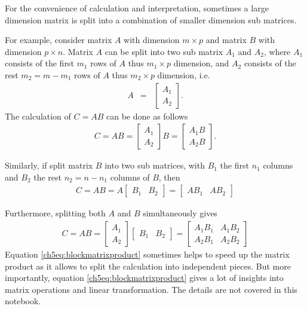 For the convenience of calculation and interpretation, sometimes a large dimension matrix is split into a combination of smaller dimension sub matrices.

For example, consider matrix $A$ with dimension $m \times p$ and matrix $B$ with dimension $p\times n$. Matrix $A$ can be split into two sub matrix $A_1$ and $A_2$, where $A_1$ consists of the first $m_1$ rows of $A$ thus $m_1 \times p$ dimension, and $A_2$ consists of the rest $m_2 = m - m_1$ rows of $A$ thus $m_2\times p$ dimension, i.e.
\begin{eqnarray}
    A &=& \left[\begin{array}{c}
         A_1  \\
         A_2 
    \end{array}\right]. \nonumber
\end{eqnarray}
The calculation of $C=AB$ can be done as follows
\begin{eqnarray}
    C = AB = \left[\begin{array}{c}
         A_1  \\
         A_2 
    \end{array}\right]B = \left[\begin{array}{c}
         A_1B  \\
         A_2B 
    \end{array}\right]. \nonumber
\end{eqnarray}

Similarly, if split matrix $B$ into two sub matrices, with $B_1$ the first $n_1$ columns and $B_2$ the rest $n_2 = n - n_1$ columns of $B$, then
\begin{eqnarray}
    C = AB = A \left[\begin{array}{cc}
        B_1 & B_2 
    \end{array}\right] = \left[\begin{array}{cc}
        AB_1 & AB_2 
    \end{array}\right] \nonumber
\end{eqnarray}

Furthermore, splitting both $A$ and $B$ simultaneously gives
\begin{eqnarray}
    C = AB = \left[\begin{array}{c}
         A_1  \\
         A_2 
    \end{array}\right] \left[\begin{array}{cc}
        B_1 & B_2 
    \end{array}\right] = \left[\begin{array}{cc}
        A_1B_1 & A_1B_2 \\
        A_2B_1 & A_2B_2
    \end{array}\right] \label{ch5eq:blockmatrixproduct}
\end{eqnarray}
Equation \eqref{ch5eq:blockmatrixproduct} sometimes helps to speed up the matrix product as it allows to split the calculation into independent pieces. But more importantly, equation \eqref{ch5eq:blockmatrixproduct} gives a lot of insights into matrix operations and linear transformation. The details are not covered in this notebook.

